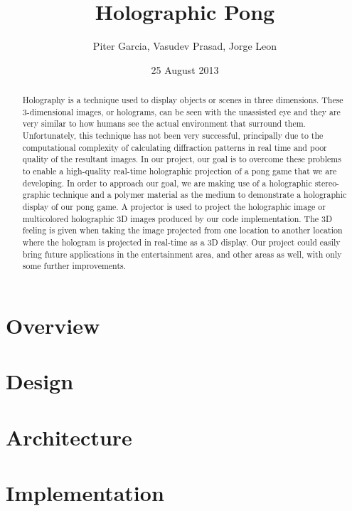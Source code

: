 \documentclass{sig-alternate}
\begin{document}
\title{Holographic Pong}
\author{ 
\alignauthor
Piter Garcia,
Vasudev Prasad,
Jorge Leon
}
\date{25 August 2013}
\maketitle
\begin{abstract}
Holography is a technique used to display objects or scenes in three dimensions. These 3-dimensional images, or holograms, can be seen with the unassisted eye and they are very similar to how humans see the actual environment that surround them. Unfortunately, this technique has not been very successful, principally due to the computational complexity of calculating diffraction patterns in real time and poor quality of the resultant images. In our project, our goal is to overcome these problems to enable a high-quality real-time holographic projection of a pong game that we are developing. In order to approach our goal, we are making use of a holographic stereo-graphic technique and a polymer material as the medium to demonstrate a holographic display of our pong game. A projector is used to project the holographic image or multicolored holographic 3D images produced by our code implementation. The 3D feeling is given when taking the image projected from one location to another location where the hologram is projected in real-time as a 3D display. Our project could easily bring future applications in the entertainment area, and other areas as well, with only some further improvements.
\end{abstract}

\section{Overview}
\label{overview}


\section{Design}
\label{design considerations}


\section{Architecture}
\label{architecture}


\section{Implementation}
\label{implementation}
\end{document}
